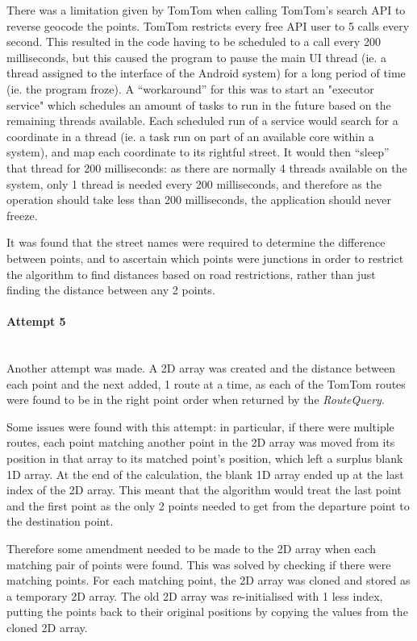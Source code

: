\documentclass[12pt,a4paper]{article}
\newcommand{\myparagraph}[1]{\paragraph{#1}\mbox{}\\}
\begin{document}
There was a limitation given by TomTom when calling TomTom's search API to reverse geocode the points. TomTom restricts every free API user to 5 calls every second.  This resulted in the code having to be scheduled to a call every 200 milliseconds, but this caused the program to pause the main UI thread (ie. a thread assigned to the interface of the Android system) for a long period of time (ie. the program froze). A \enquote{workaround} for this was to start an "executor service" which schedules an amount of tasks to run in the future based on the remaining threads available. Each scheduled run of a service would search for a coordinate in a thread (ie. a task run on part of an available core within a system), and map each coordinate to its rightful street. It would then \enquote{sleep} that thread for 200 milliseconds: as there are normally 4 threads available on the system, only 1 thread is needed every 200 milliseconds, and therefore as the operation should take less than 200 milliseconds, the application should never freeze.

It was found that the street names were required to determine the difference between points, and to ascertain which points were junctions in order to restrict the algorithm to find distances based on road restrictions, rather than just finding the distance between any 2 points.

\myparagraph{Attempt 5}
Another attempt was made. A 2D array was created and the distance between each point and the next added, 1 route at a time, as each of the TomTom routes were found to be in the right point order when returned by the \textit{RouteQuery}. 

Some issues were found with this attempt: in particular, if there were multiple routes, each point matching another point in the 2D array was moved from its position in that array to its matched point's position, which left a surplus blank 1D array. At the end of the calculation, the blank 1D array ended up at the last index of the 2D array. This meant that the algorithm would treat the last point and the first point as the only 2 points needed to get from the departure point to the destination point.

Therefore some amendment needed to be made to the 2D array when each matching pair of points were found. This was solved by checking if there were matching points. For each matching point, the 2D array was cloned and stored as a temporary 2D array. The old 2D array was re-initialised with 1 less index, putting the points back to their original positions by copying the values from the cloned 2D array. 
\end{document}

